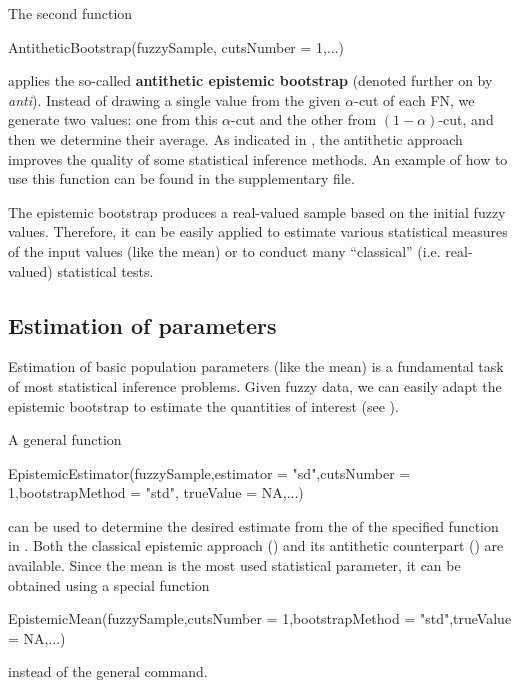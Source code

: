 The second function
\begin{example}
AntitheticBootstrap(fuzzySample, cutsNumber = 1,...)
\end{example}
applies the so-called \textbf{antithetic epistemic bootstrap} (denoted further on by \emph{anti}).
Instead of drawing a single value from the given $\alpha$-cut of each FN, we generate two values: one from this $\alpha$-cut and the other from $(1-\alpha)$-cut, and then we determine their average.
As indicated in \cite{10.1007/978-3-031-08974-9_39,pgmr2022}, the antithetic approach improves the quality of some statistical inference methods.
An example of how to use this function can be found in the supplementary file.

The epistemic bootstrap produces a real-valued sample based on the initial fuzzy values.
Therefore, it can be easily applied to estimate various statistical measures of the input values (like the mean) or to conduct many ``classical'' (i.e. real-valued) statistical tests.




\subsection{Estimation of parameters}


Estimation of basic population parameters (like the mean) is a fundamental task of most statistical inference problems. Given fuzzy data, we can easily adapt the epistemic bootstrap to estimate the quantities of interest (see  \citep{pgmr2022}).

A general function
\begin{example}
EpistemicEstimator(fuzzySample,estimator = "sd",cutsNumber = 1,bootstrapMethod = "std",
  trueValue = NA,...)
\end{example}
can be used to determine the desired estimate from the  of the specified function in .
Both the classical epistemic approach () and its antithetic counterpart () are  available.
Since the mean is the most used statistical parameter, it can be obtained using a special function
\begin{example}
EpistemicMean(fuzzySample,cutsNumber = 1,bootstrapMethod = "std",trueValue = NA,...)
\end{example}
instead of the general command.

